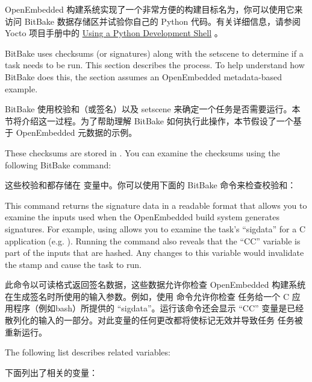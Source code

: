 OpenEmbedded 构建系统实现了一个非常方便的构建目标名为，你可以使用它来访问 BitBake 数据存储区并试验你自己的 Python 代码。有关详细信息，请参阅 Yocto 项目手册中的 \href{https://docs.yoctoproject.org/dev-manual/python-development-shell.html#using-a-python-development-shell}{Using a Python Development Shell} 。


\label{section:Task Checksums and Setscene}

BitBake uses checksums (or signatures) along with the setscene to determine if a task needs to be run. This section describes the process. To help understand how BitBake does this, the section assumes an OpenEmbedded metadata-based example.

BitBake 使用校验和（或签名）以及 setscene 来确定一个任务是否需要运行。本节将介绍这一过程。为了帮助理解 BitBake 如何执行此操作，本节假设了一个基于 OpenEmbedded 元数据的示例。

These checksums are stored in . You can examine the checksums using the following BitBake command:

这些校验和都存储在  变量中。你可以使用下面的 BitBake 命令来检查校验和：


This command returns the signature data in a readable format that allows you to examine the inputs used when the OpenEmbedded build system generates signatures. For example, using  allows you to examine the  task's ``sigdata'' for a C application (e.g. ). Running the command also reveals that the ``CC'' variable is part of the inputs that are hashed. Any changes to this variable would invalidate the stamp and cause the  task to run.

此命令以可读格式返回签名数据，这些数据允许你检查 OpenEmbedded 构建系统在生成签名时所使用的输入参数。例如，使用  命令允许你检查  任务给一个 C 应用程序（例如bash）所提供的 ``sigdata''。运行该命令还会显示 ``CC'' 变量是已经散列化的输入的一部分。对此变量的任何更改都将使标记无效并导致任务  任务被重新运行。

The following list describes related variables:

下面列出了相关的变量：

